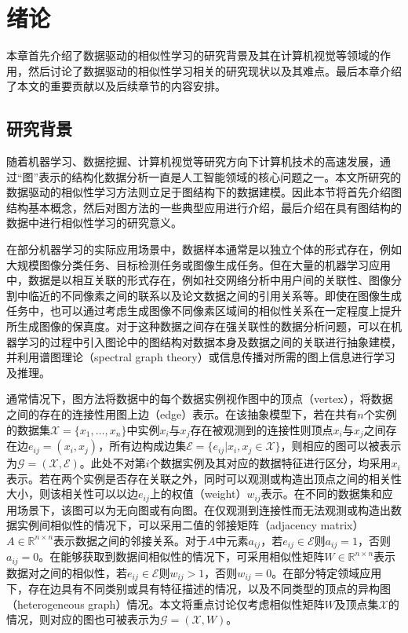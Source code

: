 \chapter{绪论}
本章首先介绍了数据驱动的相似性学习的研究背景及其在计算机视觉等领域的作用，然后讨论了数据驱动的相似性学习相关的研究现状以及其难点。最后本章介绍了本文的重要贡献以及后续章节的内容安排。
\section{研究背景}
随着机器学习、数据挖掘、计算机视觉等研究方向下计算机技术的高速发展，通过“图”\cite{chung1997spectral}表示的结构化数据分析一直是人工智能领域的核心问题之一。本文所研究的数据驱动的相似性学习方法则立足于图结构下的数据建模。因此本节将首先介绍图结构基本概念，然后对图方法的一些典型应用进行介绍，最后介绍在具有图结构的数据中进行相似性学习的研究意义。

在部分机器学习的实际应用场景中，数据样本通常是以独立个体的形式存在，例如大规模图像分类任务、目标检测任务或图像生成任务。但在大量的机器学习应用中，数据是以相互关联的形式存在，例如社交网络分析中用户间的关联性、图像分割中临近的不同像素之间的联系以及论文数据之间的引用关系等。即使在图像生成任务中，也可以通过考虑生成图像不同像素区域间的相似性关系在一定程度上提升所生成图像的保真度\cite{zhang2018self}。对于这种数据之间存在强关联性的数据分析问题，可以在机器学习的过程中引入图论中的图结构对数据本身及数据之间的关联进行抽象建模，并利用谱图理论（spectral graph theory）\cite{chung1997spectral}或信息传播对所需的图上信息进行学习及推理。

通常情况下，图方法将数据中的每个数据实例视作图中的顶点（vertex），将数据之间的存在的连接性用图上边（edge）表示。在该抽象模型下，若在共有$n$个实例的数据集$\mathcal{X}=\{x_1,\dots,x_n\}$中实例$x_i$与$x_j$存在被观测到的连接性则顶点$x_i$与$x_j$之间存在边$e_{ij}=(x_i, x_j)$，所有边构成边集$\mathcal{E}=\{e_{ij}|x_i, x_j\in \mathcal{X}\}$，则相应的图可以被表示为$\mathcal{G} = (\mathcal{X}, \mathcal{E})$。此处不对第$i$个数据实例及其对应的数据特征进行区分，均采用$x_i$表示。若在两个实例是否存在关联之外，同时可以观测或构造出顶点之间的相关性大小，则该相关性可以以边$e_{ij}$上的权值（weight）$w_{ij}$表示。在不同的数据集和应用场景下，该图可以为无向图或有向图。在仅观测到连接性而无法观测或构造出数据实例间相似性的情况下，可以采用二值的邻接矩阵（adjacency matrix）$A\in\mathbb{R}^{n\times n}$表示数据之间的邻接关系。对于$A$中元素$a_{ij}$，若$e_{ij}\in \mathcal{E}$则$a_{ij}=1$，否则$a_{ij}=0$。在能够获取到数据间相似性的情况下，可采用相似性矩阵$W\in\mathbb{R}^{n\times n}$表示数据对之间的相似性，若$e_{ij}\in \mathcal{E}$则$w_{ij}>1$，否则$w_{ij}=0$。在部分特定领域应用下，存在边具有不同类别或具有特征描述的情况，以及不同类型的顶点的异构图（heterogeneous graph）情况。本文将重点讨论仅考虑相似性矩阵$W$及顶点集$\mathcal{X}$的情况，则对应的图也可被表示为$\mathcal{G} = (\mathcal{X}, W)$。


